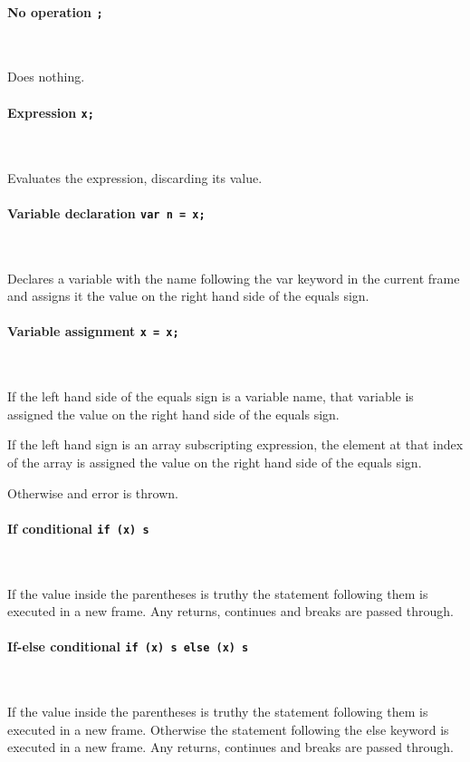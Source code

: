 \paragraph{No operation \quad \texttt{;}} \

Does nothing.

\paragraph{Expression \quad \texttt{x;}} \

Evaluates the expression, discarding its value.

\paragraph{Variable declaration \quad \texttt{var n = x;} } \

Declares a variable with the name following the var keyword in the current frame and assigns it the value on the right hand side of the equals sign.

\paragraph{Variable assignment \quad \texttt{x = x;} } \

If the left hand side of the equals sign is a variable name, that variable is assigned the value on the right hand side of the equals sign.

If the left hand sign is an array subscripting expression, the element at that index of the array is assigned the value on the right hand side of the equals sign.

Otherwise and error is thrown.

\paragraph{If conditional \quad \texttt{if (x) s} } \

If the value inside the parentheses is truthy the statement following them is executed in a new frame. Any returns, continues and breaks are passed through.

\paragraph{If-else conditional \quad \texttt{if (x) s else (x) s} } \

If the value inside the parentheses is truthy the statement following them is executed in a new frame. Otherwise the statement following the else keyword is executed in a new frame. Any returns, continues and breaks are passed through.

